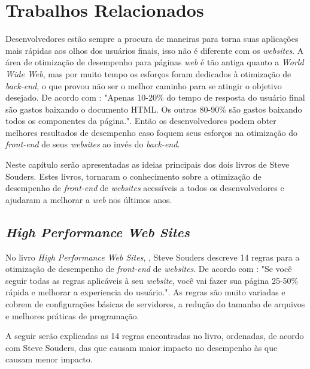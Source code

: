 %
%

\chapter{Trabalhos Relacionados}
Desenvolvedores estão sempre a procura de maneiras para torna suas aplicações mais rápidas aos olhos dos usuários finais, isso não é diferente com os \textit{websites}. A área de otimização de desempenho para páginas \textit{web} é tão antiga quanto a \textit{World Wide Web}, mas por muito tempo os esforços foram dedicados à otimização de \textit{back-end}, o que \cite{HighPerformance} provou não ser o melhor caminho para se atingir o objetivo desejado. De acordo com : "Apenas 10-20\% do tempo de resposta do usuário final são gastos baixando o documento HTML. Os outros 80-90\% são gastos baixando todos os componentes da página.". Então os desenvolvedores podem obter melhores resultados de desempenho caso foquem seus esforços na otimização do \textit{front-end} de seus \textit{websites} ao invés do \textit{back-end}.

Neste capítulo serão apresentadas as ideias principais dos dois livros  de Steve Souders. Estes livros, tornaram o conhecimento sobre a otimização de desempenho de \textit{front-end} de \textit{websites} acessíveis a todos os desenvolvedores e ajudaram a melhorar a \textit{web} nos últimos anos.

\section{\textit{High Performance Web Sites}}
\label{sec:highperformancewebsites}

No livro \textit{High Performance Web Sites}, \cite{HighPerformance}, Steve Souders descreve 14 regras para a otimização de desempenho de \textit{front-end} de \textit{websites}. De acordo com : "Se você seguir todas as regras aplicáveis à seu \textit{website}, você vai fazer sua página 25-50\% rápida e melhorar a experiencia do usuário.". As regras são muito variadas e cobrem de configurações básicas de servidores, a redução do tamanho de arquivos e melhores práticas de programação.

A seguir serão explicadas as 14 regras encontradas no livro, ordenadas, de acordo com Steve Souders, das que causam maior impacto no desempenho às que causam menor impacto.

